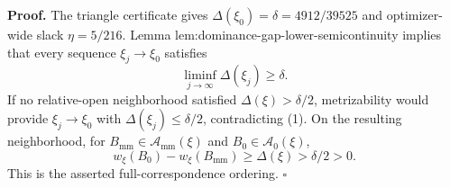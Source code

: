 \textbf{Proof.}
The triangle certificate gives \(\Delta(\xi_0)=\delta=4912/39525\) and optimizer-wide slack \(\eta=5/216\).  Lemma lem:dominance-gap-lower-semicontinuity implies that every sequence \(\xi_j\to\xi_0\) satisfies
\[
\liminf_{j\to\infty}\Delta(\xi_j)\ge\delta.
\tag{1}
\]
If no relative-open neighborhood satisfied \(\Delta(\xi)>\delta/2\), metrizability would provide \(\xi_j\to\xi_0\) with \(\Delta(\xi_j)\le\delta/2\), contradicting (1).  On the resulting neighborhood, for \(B_{\mathrm{mm}}\in\mathcal A_{\mathrm{mm}}(\xi)\) and \(B_0\in\mathcal A_0(\xi)\),
\[
w_\xi(B_0)-w_\xi(B_{\mathrm{mm}})
\ge\Delta(\xi)>\delta/2>0.
\]
This is the asserted full-correspondence ordering. \(\square\)